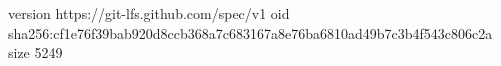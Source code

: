version https://git-lfs.github.com/spec/v1
oid sha256:cf1e76f39bab920d8ccb368a7c683167a8e76ba6810ad49b7c3b4f543c806c2a
size 5249
